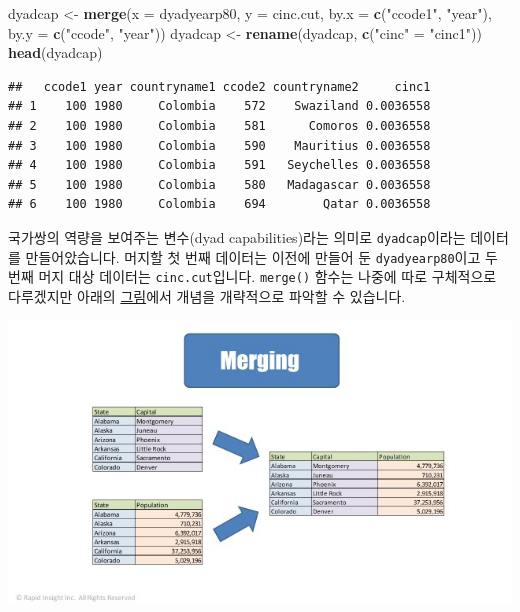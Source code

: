 \documentclass[]{book}
\newenvironment{Shaded}{\begin{snugshade}}{\end{snugshade}}
\newcommand{\DataTypeTok}[1]{\textcolor[rgb]{0.13,0.29,0.53}{#1}}
\newcommand{\KeywordTok}[1]{\textcolor[rgb]{0.13,0.29,0.53}{\textbf{#1}}}
\newcommand{\NormalTok}[1]{#1}
\newcommand{\StringTok}[1]{\textcolor[rgb]{0.31,0.60,0.02}{#1}}
\begin{document}
\begin{Shaded}
\begin{Highlighting}[]
\NormalTok{dyadcap <-}\StringTok{ }\KeywordTok{merge}\NormalTok{(}\DataTypeTok{x =}\NormalTok{ dyadyearp80,}
                 \DataTypeTok{y =}\NormalTok{ cinc.cut,}
                 \DataTypeTok{by.x =} \KeywordTok{c}\NormalTok{(}\StringTok{"ccode1"}\NormalTok{, }\StringTok{"year"}\NormalTok{),}
                 \DataTypeTok{by.y =} \KeywordTok{c}\NormalTok{(}\StringTok{"ccode"}\NormalTok{, }\StringTok{"year"}\NormalTok{))}
\NormalTok{dyadcap <-}\StringTok{ }\KeywordTok{rename}\NormalTok{(dyadcap, }\KeywordTok{c}\NormalTok{(}\StringTok{"cinc"}\NormalTok{ =}\StringTok{ "cinc1"}\NormalTok{))}
\KeywordTok{head}\NormalTok{(dyadcap)}
\end{Highlighting}
\end{Shaded}

\begin{verbatim}
##   ccode1 year countryname1 ccode2 countryname2     cinc1
## 1    100 1980     Colombia    572    Swaziland 0.0036558
## 2    100 1980     Colombia    581      Comoros 0.0036558
## 3    100 1980     Colombia    590    Mauritius 0.0036558
## 4    100 1980     Colombia    591   Seychelles 0.0036558
## 5    100 1980     Colombia    580   Madagascar 0.0036558
## 6    100 1980     Colombia    694        Qatar 0.0036558
\end{verbatim}

국가쌍의 역량을 보여주는 변수(dyad capabilities)라는 의미로 \texttt{dyadcap}이라는 데이터를 만들어았습니다. 머지할 첫 번째 데이터는 이전에 만들어 둔 \texttt{dyadyearp80}이고 두 번째 머지 대상 데이터는 \texttt{cinc.cut}입니다. \texttt{merge()} 함수는 나중에 따로 구체적으로 다루겠지만 아래의 \href{(https://www.rapidinsightinc.com/7-data-cleanup-terms-explained-visually/)}{그림}에서 개념을 개략적으로 파악할 수 있습니다.

\includegraphics{r.post/Merging.jpg}
\end{document}
